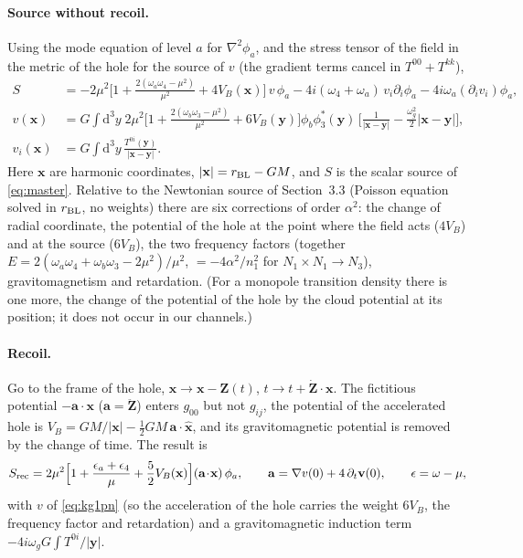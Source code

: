 \documentclass[11pt]{article}
\newcommand{\bx}{\mathbf{x}}\newcommand{\by}{\mathbf{y}}
\newcommand{\dd}{\mathrm{d}}
\begin{document}
\paragraph{Source without recoil.} Using the mode equation of level $a$ for $\nabla^2\phi_a$, and the stress tensor of the field in
the metric of the hole for the source of $v$ (the gradient terms cancel in $T^{00}+T^{kk}$),
\begin{equation}
\begin{aligned}
S&=-2\mu^2\Big[1+\frac{2(\omega_a\omega_4-\mu^2)}{\mu^2}+4V_B(\bx)\Big]\,v\,\phi_a-4i(\omega_4+\omega_a)\,v_i\partial_i\phi_a-4i\omega_a(\partial_iv_i)\phi_a,\\
v(\bx)&=G\!\int\!\dd^3y\;2\mu^2\Big[1+\frac{2(\omega_b\omega_3-\mu^2)}{\mu^2}+6V_B(\by)\Big]\phi_b\phi_3^*(\by)\,\Big[\frac{1}{|\bx-\by|}-\frac{\omega_g^2}{2}|\bx-\by|\Big],\\
v_i(\bx)&=G\!\int\!\dd^3y\,\frac{T^{0i}(\by)}{|\bx-\by|}. \label{eq:kg1pn}
\end{aligned}
\end{equation}
Here $\bx$ are harmonic coordinates, $|\bx|=r_{\rm BL}-GM$, and $S$ is the scalar source of \eqref{eq:master}. Relative to the
Newtonian source of Section~3.3 (Poisson equation solved in $r_{\rm BL}$, no weights) there are six corrections of order $\alpha^2$:
the change of radial coordinate, the potential of the hole at the point where the field acts ($4V_B$) and at the source ($6V_B$),
the two frequency factors (together $E=2(\omega_a\omega_4+\omega_b\omega_3-2\mu^2)/\mu^2$, $=-4\alpha^2/n_1^2$ for $N_1\times N_1\to N_3$),
gravitomagnetism and retardation. (For a monopole transition density there is one more, the change of the potential of the hole by
the cloud potential at its position; it does not occur in our channels.)

\paragraph{Recoil.} Go to the frame of the hole, $\bx\to\bx-\mathbf Z(t)$, $t\to t+\dot{\mathbf Z}\!\cdot\!\bx$. The fictitious potential
$-\mathbf a\!\cdot\!\bx$ ($\mathbf a=\ddot{\mathbf Z}$) enters $g_{00}$ but not $g_{ij}$, the potential of the accelerated hole is
$V_B=GM/|\bx|-\tfrac12GM\,\mathbf a\!\cdot\!\hat{\bx}$, and its gravitomagnetic potential is removed by the change of time. The result is
\begin{equation}
S_{\rm rec}=2\mu^2\Big[1+\frac{\epsilon_a+\epsilon_4}{\mu}+\frac52V_B(\bx)\Big](\mathbf a\!\cdot\!\bx)\,\phi_a,\qquad
\mathbf a=\nabla v(0)+4\,\partial_t\mathbf v(0),\qquad\epsilon=\omega-\mu,
\end{equation}
with $v$ of \eqref{eq:kg1pn} (so the acceleration of the hole carries the weight $6V_B$, the frequency factor and retardation) and a
gravitomagnetic induction term $-4i\omega_gG\!\int\!T^{0i}/|\by|$.
\end{document}
